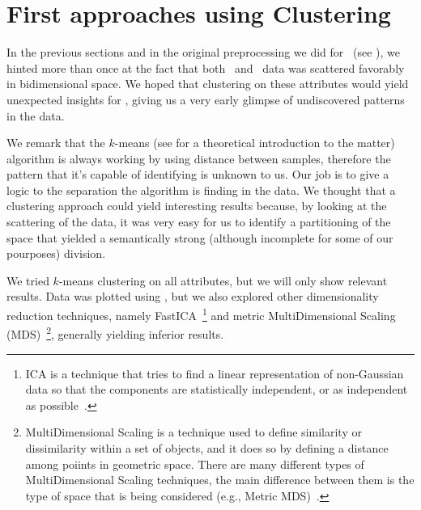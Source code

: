 \section{First approaches using Clustering}
\label{sec:qlp-cluster}
In the previous sections and in the original preprocessing we did for \qrp\ (see
), we hinted more than once at the fact that both \an\ and \cnmod\ data was scattered favorably in
bidimensional space. We hoped that clustering on these attributes would yield unexpected insights
for \qlp, giving us a very early glimpse of undiscovered patterns in the data.

We remark that the $k$-means (see  for a theoretical introduction to the matter)
algorithm is always working by using distance between samples, therefore the pattern that it's
capable of identifying is unknown to us. Our job is to give a logic to the separation the algorithm
is finding in the data. We thought that a clustering approach could yield interesting results
because, by looking at the scattering of the data, it was very easy for us to identify a
partitioning of the space that yielded a semantically strong (although incomplete for some of our
pourposes) division.

We tried $k$-means clustering on all attributes, but we will only show relevant results. Data was plotted using \pca, but we also explored other dimensionality reduction techniques, namely FastICA~\footnote{
	ICA is a technique that tries to find a linear representation of non-Gaussian data so that
	the components are statistically independent, or as independent as possible~\cite{hyvarinen2000-fastICA}.
} and metric MultiDimensional Scaling (MDS)~\footnote{
	MultiDimensional Scaling is a technique used to define similarity or dissimilarity within a
	set of objects, and it does so by defining a distance among poiints in geometric space.
	There are many different types of MultiDimensional Scaling techniques, the main difference
	between them is the type of space that is being considered (e.g., Metric
	MDS)~\cite{Borg2005-metricMDS}.
}, generally yielding inferior results.

